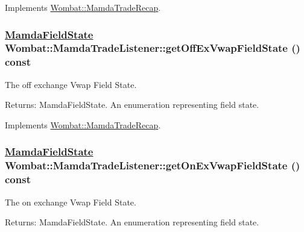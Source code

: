 Implements \hyperlink{classWombat_1_1MamdaTradeRecap_4a05775b568f16662fdcf8f34f5cecde}{Wombat::Mamda\-Trade\-Recap}.\hypertarget{classWombat_1_1MamdaTradeListener_218b607fb4f815873eea2fc4da9f4f8c}{
\subsubsection[getOffExVwapFieldState]{\setlength{\rightskip}{0pt plus 5cm}\hyperlink{namespaceWombat_93aac974f2ab713554fd12a1fa3b7d2a}{Mamda\-Field\-State} Wombat::Mamda\-Trade\-Listener::get\-Off\-Ex\-Vwap\-Field\-State () const}}
\label{classWombat_1_1MamdaTradeListener_218b607fb4f815873eea2fc4da9f4f8c}


The off exchange Vwap Field State. 

\begin{Desc}
\item[Returns:]Mamda\-Field\-State. An enumeration representing field state. \end{Desc}


Implements \hyperlink{classWombat_1_1MamdaTradeRecap_73079a6a76e523eb7693e9102743ba7c}{Wombat::Mamda\-Trade\-Recap}.\hypertarget{classWombat_1_1MamdaTradeListener_9b42325544667eb9015a42f1cbed4f72}{
\subsubsection[getOnExVwapFieldState]{\setlength{\rightskip}{0pt plus 5cm}\hyperlink{namespaceWombat_93aac974f2ab713554fd12a1fa3b7d2a}{Mamda\-Field\-State} Wombat::Mamda\-Trade\-Listener::get\-On\-Ex\-Vwap\-Field\-State () const}}
\label{classWombat_1_1MamdaTradeListener_9b42325544667eb9015a42f1cbed4f72}


The on exchange Vwap Field State. 

\begin{Desc}
\item[Returns:]Mamda\-Field\-State. An enumeration representing field state. \end{Desc}


